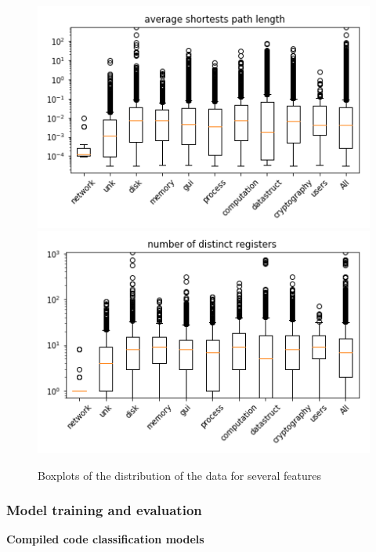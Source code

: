 \begin{figure}[H]
%
  \centering
    \includegraphics[width=0.9\linewidth]{img/boxplots/v1_unbalanced_average_shortests_path_length.png}
\endminipage
{}%
  \centering
    \includegraphics[width=0.9\linewidth]{img/boxplots/v1_unbalanced_number_of_distinct_registers.png}
\endminipage
\caption{Boxplots of the distribution of the data for several features}\label{fig:distribution_analysis}
\end{figure}





\subsubsection{Model training and evaluation}




\textbf{Compiled code classification models}

